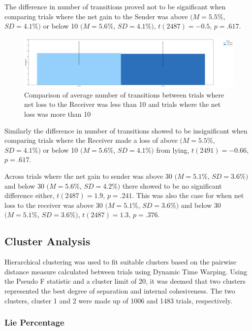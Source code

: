\documentclass[man, floatsintext]{apa7}
\begin{document}
The difference in number of transitions proved not to be significant when comparing trials where the net gain to the Sender was above $(M = 5.5\%$, $SD = 4.1\%)$ or below 10 $(M = 5.6\%$, $SD = 4.1\%)$, $t(2487)=-0.5$, $p=.617$.

\begin{figure}[H]
	\centering
	\includegraphics[width=0.75\linewidth]{../plots/RESPONSE/NTransitionPerLossPlot.png}
	\caption{Comparison of average number of transitions between trials where net loss to the Receiver was less than 10 and trials where the net loss was more than 10}
	\label{fig:NTransitionPerLoss}
\end{figure}

Similarly the difference in number of transitions showed to be insignificant when comparing trials where the Receiver made a loss of above $(M = 5.5\%$, $SD = 4.1\%)$  or below 10 $(M = 5.6\%$, $SD = 4.1\%)$ from lying, $t(2491)=-0.66$, $p=.617$.

Across trials where the net gain to sender was above 30 $(M = 5.1\%$, $SD = 3.6\%)$ and below 30 $(M = 5.6\%$, $SD = 4.2\%)$ there showed to be no significant difference either, $t(2487)=1.9$, $p=.241$. This was also the case for when net loss to the receiver was above 30 $(M = 5.1\%$, $SD = 3.6\%)$ and below 30 $(M = 5.1\%$, $SD = 3.6\%)$, $t(2487)=1.3$, $p=.376$.

\subsection{Cluster Analysis}

Hierarchical clustering was used to fit suitable clusters based on the pairwise distance measure calculated between trials using Dynamic Time Warping. Using the Pseudo F statistic and a cluster limit of 20, it was deemed that two clusters represented the best degree of separation and internal cohesiveness. The two clusters, cluster 1 and 2 were made up of 1006 and 1483 trials, respectively.


\subsubsection{Lie Percentage}
\end{document}
